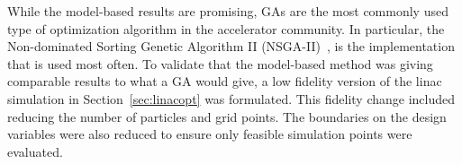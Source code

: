  \label{sec:ga}
While the model-based results are promising, 
GAs are the most commonly used type of optimization algorithm in the accelerator community.
In particular, the Non-dominated Sorting Genetic Algorithm II (NSGA-II)~\cite{NSGA}, 
is the implementation that is used most often.
To validate that the model-based method was giving comparable results to what a GA would give, 
a low fidelity version of the linac simulation in Section~\ref{sec:linacopt} was formulated.
This fidelity change included reducing the number of particles and grid points. 
The boundaries on the design variables were also reduced to ensure only 
feasible simulation points were evaluated.

